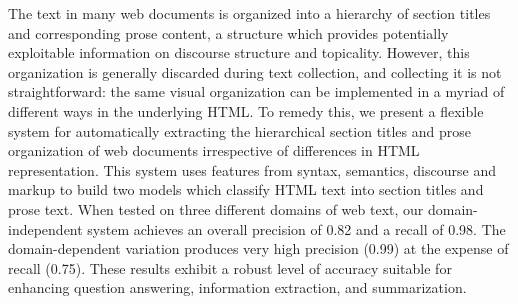 The text in many web documents is organized into a hierarchy of section titles and corresponding prose content, a structure which provides potentially exploitable information on discourse structure and topicality. However, this organization is generally discarded during text collection, and collecting it is not straightforward: the same visual organization can be implemented in a myriad of different ways in the underlying HTML. To remedy this, we present a flexible system for automatically extracting the hierarchical section titles and prose organization of web documents irrespective of differences in HTML representation. This system uses features from syntax, semantics, discourse and markup to build two models which classify HTML text into section titles and prose text. When tested on three different domains of web text, our domain-independent system achieves an overall precision of 0.82 and a recall of 0.98. The domain-dependent variation produces very high precision (0.99) at the expense of recall (0.75). These results exhibit a robust level of accuracy suitable for enhancing question answering, information extraction, and summarization.
